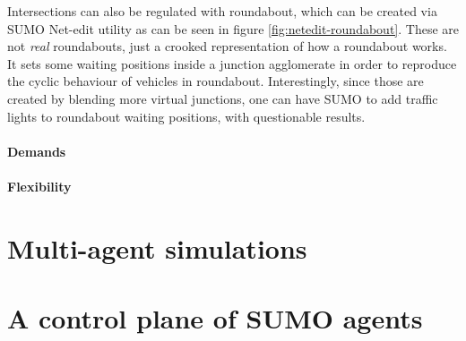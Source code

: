 
Intersections can also be regulated with roundabout, which can be created via SUMO Net-edit utility as can be seen in figure \ref{fig:netedit-roundabout}. These are not \textit{real} roundabouts, just a crooked representation of how a roundabout works. It sets some waiting positions inside a junction agglomerate in order to reproduce the cyclic behaviour of vehicles in roundabout.
Interestingly, since those are created by blending more virtual junctions, one can have SUMO to add traffic lights to roundabout waiting positions, with questionable results.


\paragraph{Demands}



\paragraph{Flexibility}


\section{Multi-agent simulations}


\section{A control plane of SUMO agents}

